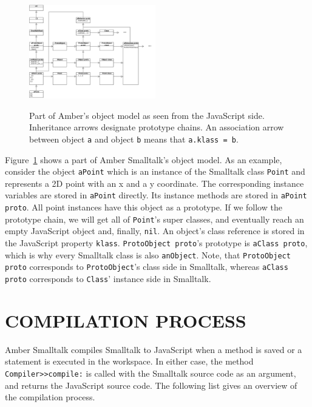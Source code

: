 \documentclass[english,paper=a4,twocolumn=true,DIV=calc,fontsize=9pt]{scrartcl}
\begin{document}
\begin{figure}
\centering
\includegraphics[width=0.49\textwidth]{amber_class_model}
\label{fig:amber_obj}
\caption{Part of Amber's object model as seen from the JavaScript side. Inheritance arrows designate prototype chains. An association arrow between object \texttt{a} and object \texttt{b} means that \texttt{a.klass = b}.}
\end{figure}

Figure~\ref{fig:amber_obj} shows a part of Amber Smalltalk's object model. As an example, consider the object \texttt{aPoint} which is an instance of the Smalltalk class \texttt{Point} and represents a 2D point with an x and a y coordinate. The corresponding instance variables are stored in \texttt{aPoint} directly. Its instance methods are stored in \texttt{aPoint proto}. All point instances have this object as a prototype. If we follow the prototype chain, we will get all of  \texttt{Point}'s super classes, and eventually reach an empty JavaScript object and, finally, \texttt{nil}. An object's class reference is stored in the JavaScript property \texttt{klass}. \texttt{ProtoObject proto}'s prototype is \texttt{aClass proto}, which is why every Smalltalk class is also \texttt{anObject}. Note, that \texttt{ProtoObject proto} corresponds to \texttt{ProtoObject}'s class side in Smalltalk, whereas \texttt{aClass proto} corresponds to \texttt{Class}' instance side in Smalltalk.


\section{COMPILATION PROCESS}
Amber Smalltalk compiles Smalltalk to JavaScript when a method is saved or a statement is executed in the workspace. In either case, the method \texttt{Compiler>>compile:} is called with the Smalltalk source code as an argument, and returns the JavaScript source code. The following list gives an overview of the compilation process.
\end{document}
